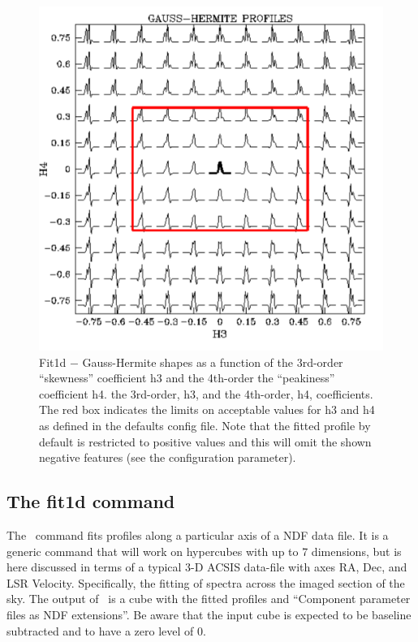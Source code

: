 \documentclass[oneside,11pt]{starlink}
\begin{document}
\begin{figure}[htb]
  \begin{center}
    \includegraphics[width=0.8\linewidth]{sun258_gaussherm}
    \caption[Gauss-Hermite shapes]{Fit1d $-$ Gauss-Hermite shapes as a function of the 3rd-order
      ``skewness'' coefficient h3 and the 4th-order the ``peakiness''
      coefficient h4.  the 3rd-order, h3, and the 4th-order, h4,
      coefficients. The red box indicates the limits on acceptable
      values for h3 and h4 as defined in the defaults config file. Note
      that the fitted profile by default is restricted to positive values
      and this will omit the shown negative features (see
      the  configuration parameter).}
    \label{fig:gaussherm}
  \end{center}
\end{figure}

\subsection{The fit1d command}

The \fitdd\ command fits profiles along a particular axis of a NDF
data file.  It is a generic command that will work on hypercubes with
up to 7 dimensions, but is here discussed in terms of a typical 3-D
ACSIS data-file with axes RA, Dec, and LSR Velocity. Specifically, the fitting
of spectra across the imaged section of the sky. The output of \fitdd\
is a cube with the fitted profiles and ``Component parameter files as
NDF extensions''. Be aware that the input cube is expected to be
baseline subtracted and to have a zero level of 0.
\end{document}

